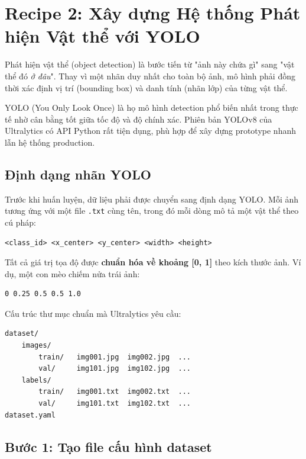\section{Recipe 2: Xây dựng Hệ thống Phát hiện Vật thể với YOLO}
\label{sec:recipe_detection}

Phát hiện vật thể (object detection) là bước tiến từ "ảnh này chứa gì" sang "vật thể đó \textit{ở đâu}". Thay vì một nhãn duy nhất cho toàn bộ ảnh, mô hình phải đồng thời xác định vị trí (bounding box) và danh tính (nhãn lớp) của từng vật thể.

YOLO (You Only Look Once) là họ mô hình detection phổ biến nhất trong thực tế nhờ cân bằng tốt giữa tốc độ và độ chính xác. Phiên bản YOLOv8 của Ultralytics có API Python rất tiện dụng, phù hợp để xây dựng prototype nhanh lẫn hệ thống production.

\subsection{Định dạng nhãn YOLO}
\label{subsec:yolo_label_format}

Trước khi huấn luyện, dữ liệu phải được chuyển sang định dạng YOLO. Mỗi ảnh tương ứng với một file \texttt{.txt} cùng tên, trong đó mỗi dòng mô tả một vật thể theo cú pháp:

\begin{verbatim}
<class_id> <x_center> <y_center> <width> <height>
\end{verbatim}

Tất cả giá trị tọa độ được \textbf{chuẩn hóa về khoảng [0, 1]} theo kích thước ảnh. Ví dụ, một con mèo chiếm nửa trái ảnh:

\begin{verbatim}
0 0.25 0.5 0.5 1.0
\end{verbatim}

Cấu trúc thư mục chuẩn mà Ultralytics yêu cầu:

\begin{verbatim}
dataset/
    images/
        train/   img001.jpg  img002.jpg  ...
        val/     img101.jpg  img102.jpg  ...
    labels/
        train/   img001.txt  img002.txt  ...
        val/     img101.txt  img102.txt  ...
dataset.yaml
\end{verbatim}

\subsection{Bước 1: Tạo file cấu hình dataset}
\label{subsec:yolo_dataset_yaml}

